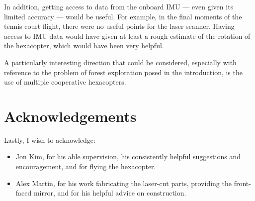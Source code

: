 \documentclass[12pt,oneside,a4paper,draft]{book}
\begin{document}
In addition, getting access to data from the onboard IMU --- even
given its limited accuracy --- would be useful. For example, in the
final moments of the tennis court flight, there were no useful points
for the laser scanner. Having access to IMU data would have given at
least a rough estimate of the rotation of the hexacopter, which would
have been very helpful.

A particularly interesting direction that could be considered,
especially with reference to the problem of forest exploration posed
in the introduction, is the use of multiple cooperative
hexacopters.

\section{Acknowledgements}
\label{sec:acknowledgements}

Lastly, I wish to acknowledge:

\begin{itemize}
\item Jon Kim, for his able supervision, his consistently helpful
  suggestions and encouragement, and for flying the hexacopter.
\item Alex Martin, for his work fabricating the laser-cut parts,
  providing the front-faced mirror, and for his helpful advice on
  construction.
\end{itemize}


%

\backmatter


\end{document}
